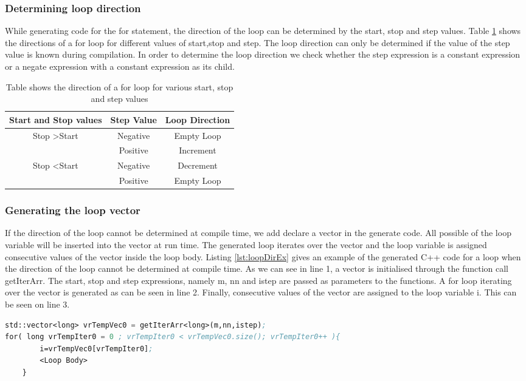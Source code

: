 \subsubsection{Determining loop direction}
While generating code for the for statement, the direction of the loop can be determined by the start, stop and step values. Table \ref{tab:loopDirection} shows the directions of a for loop for different values of start,stop and step. The loop direction can only be determined if the value of the step value is known during compilation. In order to determine the loop direction we check whether the step expression is  a constant expression or a negate expression with a constant expression as its child.
\begin{table}[htbp]
\centering
\begin{tabular}{|c|c|c|}
\hline
Start and Stop values & Step Value & Loop Direction \\ \hline
\multirow{2}{*}{Stop  \textgreater  Start} & Negative & Empty Loop \\ \cline{2-3} 
 & Positive & Increment \\ \hline
\multirow{2}{*}{Stop \textless Start} & Negative & Decrement \\ \cline{2-3} 
 & Positive & Empty Loop \\ \hline
\end{tabular}
\caption[Loop Direction]{Table shows the direction of a for loop for various start, stop and step values}
\label{tab:loopDirection}
\end{table}
\subsubsection{ Generating the loop vector}
If the direction of the loop cannot be determined at compile time, we add declare a vector in the generate code. All possible of the loop variable will be inserted into the vector at run time. The generated loop iterates over the vector and the loop variable is assigned consecutive values of the vector inside the loop body. Listing \ref{lst:loopDirEx} gives an example of the generated C++ code for a loop when the direction of the loop cannot be determined at compile time. As we can see in line 1, a vector is initialised through the function call \textsf{getIterArr}. The start, stop and step expressions, namely \textsf{m}, \textsf{nn} and \textsf{istep} are passed as parameters to the functions. A for loop iterating over the vector is generated as can be seen in line 2. Finally, consecutive values of the vector are assigned to the loop variable \textsf{i}. This can be seen on line 3. 
\begin{lstlisting}[language=lisp, label={lst:loopDirEx}, caption={The listing gives an example of generated C++ code when the loop direction cannot be determined}]
std::vector<long> vrTempVec0 = getIterArr<long>(m,nn,istep);
for( long vrTempIter0 = 0 ; vrTempIter0 < vrTempVec0.size(); vrTempIter0++ ){	   
		i=vrTempVec0[vrTempIter0];
		<Loop Body>
	}
\end{lstlisting}

